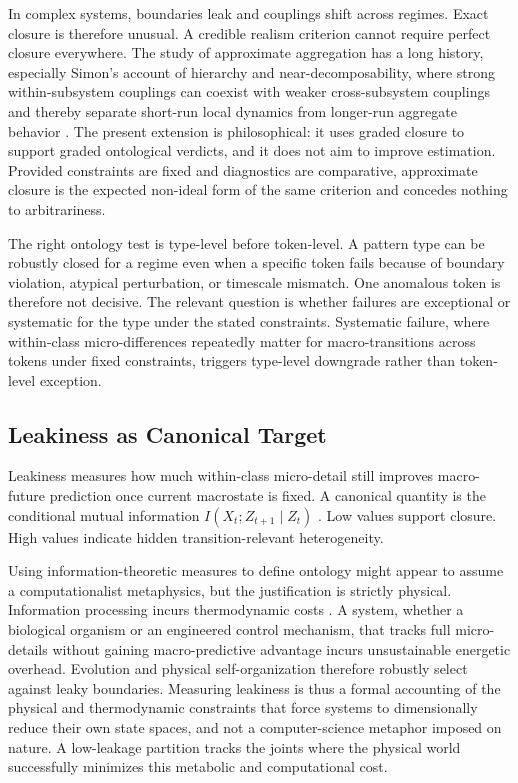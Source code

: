 In complex systems, boundaries leak and couplings shift across regimes.
Exact closure is therefore unusual. A credible realism criterion cannot
require perfect closure everywhere. The study of approximate
aggregation has a long history, especially Simon's account of hierarchy
and near-decomposability, where strong within-subsystem couplings can
coexist with weaker cross-subsystem couplings and thereby separate
short-run local dynamics from longer-run aggregate behavior
\citep{simon1962,ando1961}. The present extension is philosophical: it
uses graded closure to support graded ontological verdicts, and it does
not aim to improve estimation. Provided constraints are fixed and
diagnostics are comparative, approximate closure is the expected
non-ideal form of the same criterion and concedes nothing to
arbitrariness.

The right ontology test is type-level before token-level. A pattern type
can be robustly closed for a regime even when a specific token fails
because of boundary violation, atypical perturbation, or timescale
mismatch. One anomalous token is therefore not decisive. The relevant
question is whether failures are exceptional or systematic for the type
under the stated constraints. Systematic failure, where within-class
micro-differences repeatedly matter for macro-transitions across tokens
under fixed constraints, triggers type-level downgrade rather than
token-level exception.

\subsection{Leakiness as Canonical
	Target}\label{leakiness-as-canonical-target}

Leakiness measures how much within-class micro-detail still improves
macro-future prediction once current macrostate is fixed. A canonical
quantity is the conditional mutual information \(I(X_t; Z_{t+1} \mid Z_t)\)
\citep[eqs.~(2.60)--(2.61)]{cover2006}. Low values support closure.
High values indicate hidden transition-relevant heterogeneity.

Using information-theoretic measures to define ontology might appear to
assume a computationalist metaphysics, but the justification is
strictly physical. Information processing incurs thermodynamic costs
\citep{landauer1961}. A system, whether a biological organism or an
engineered control mechanism, that tracks full micro-details without
gaining macro-predictive advantage incurs unsustainable energetic
overhead. Evolution and physical self-organization therefore robustly
select against leaky boundaries. Measuring leakiness is thus a formal
accounting of the physical and thermodynamic constraints that force
systems to dimensionally reduce their own state spaces, and not a
computer-science metaphor imposed on nature. A low-leakage partition
tracks the joints where the physical world successfully minimizes this
metabolic and computational cost.

